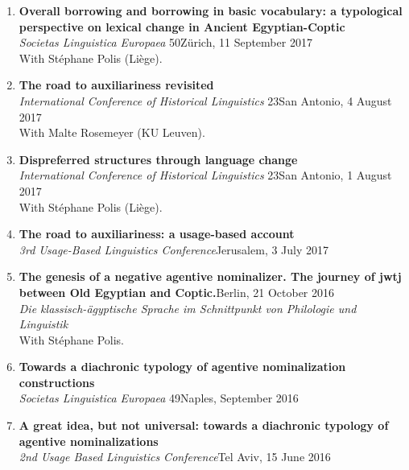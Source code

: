 \documentclass[letterpaper,11pt]{article}
\begin{document}
\begin{enumerate}
\item \textbf{Overall borrowing and borrowing in basic vocabulary: a typological perspective on lexical change in Ancient Egyptian-Coptic}\\{\textit{Societas Linguistica Europaea }} 50\hfill{Z\"urich, 11 September 2017}\\With St\'{e}phane Polis (Li\`{e}ge).

\item \textbf{The road to auxiliariness revisited}\\
{\textit{International Conference of Historical Linguistics }} 23\hfill{San Antonio, 4 August 2017}\\With Malte Rosemeyer (KU Leuven).

\item \textbf{Dispreferred structures through language change}\\{\textit{International Conference of Historical Linguistics }} 23\hfill{San Antonio, 1 August 2017}\\{With St\'{e}phane Polis (Li\`{e}ge).}


\item \textbf{The road to auxiliariness: a usage-based account}\\{\textit{3rd Usage-Based Linguistics Conference}}\hfill{Jerusalem, 3 July 2017}

\item \textbf{The genesis of a negative agentive nominalizer. The journey of jwtj between Old Egyptian and Coptic.}\hfill{Berlin, 21 October 2016}\\
\textit{Die klassisch-ägyptische Sprache im Schnittpunkt von Philologie und
Linguistik}\\
With St\'ephane Polis.

\item \textbf{Towards a diachronic typology of agentive nominalization constructions}\\{\textit{Societas Linguistica Europaea }} 49\hfill{Naples, September 2016}

\item \textbf{A great idea, but not universal: towards a diachronic typology of agentive nominalizations}\\ 
\textit{2nd Usage Based Linguistics Conference}\hfill{Tel Aviv, 15 June 2016}


\end{enumerate}
\end{document}

